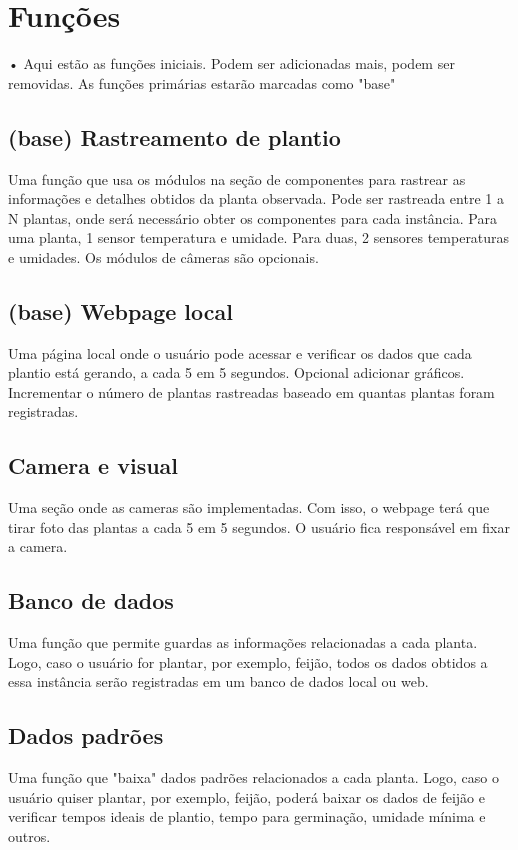 \documentclass[main.tex]{subfiles}
\begin{document}
\section{Funções}
•
Aqui estão as funções iniciais. Podem ser adicionadas mais, podem ser removidas. As funções primárias estarão marcadas como "base"

\subsection{(base) Rastreamento de plantio}
Uma função que usa os módulos na seção de componentes para rastrear as informações e detalhes obtidos da planta observada. Pode ser rastreada entre 1 a N plantas, onde será necessário obter os componentes para cada instância. \newline
Para uma planta, 1 sensor temperatura e umidade. Para duas, 2 sensores temperaturas e umidades. Os módulos de câmeras são opcionais. \newline

\subsection{(base) Webpage local}
Uma página local onde o usuário pode acessar e verificar os dados que cada plantio está gerando, a cada 5 em 5 segundos. Opcional adicionar gráficos. Incrementar o número de plantas rastreadas baseado em quantas plantas foram registradas. \newline

\subsection{Camera e visual}
Uma seção onde as cameras são implementadas. Com isso, o webpage terá que tirar foto das plantas a cada 5 em 5 segundos. O usuário fica responsável em fixar a camera. \newline

\subsection{Banco de dados}
Uma função que permite guardas as informações relacionadas a cada planta. Logo, caso o usuário for plantar, por exemplo, feijão, todos os dados obtidos a essa instância serão registradas em um banco de dados local ou web. \newline

\subsection{Dados padrões}
Uma função que "baixa" dados padrões relacionados a cada planta. Logo, caso o usuário quiser plantar, por exemplo, feijão, poderá baixar os dados de feijão e verificar tempos ideais de plantio, tempo para germinação, umidade mínima e outros. \newline
\end{document}
